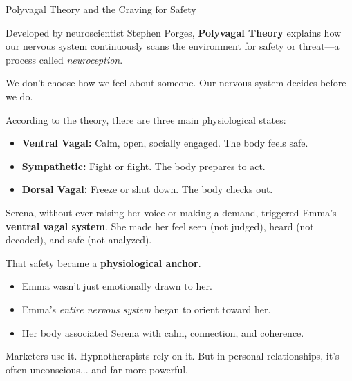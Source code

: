 \begin{PsychologicalSidebar}{Polyvagal Theory and the Craving for Safety}

    Developed by neuroscientist Stephen Porges, \textbf{Polyvagal Theory} explains how our 
    nervous system continuously scans the environment for safety or threat—a process called 
    \textit{neuroception}.
    
    \medskip
    
    We don’t choose how we feel about someone.  
    Our nervous system decides before we do.
    
    \medskip
    
    According to the theory, there are three main physiological states:

    \medskip
    
    \begin{itemize}
      \item \textbf{Ventral Vagal:} Calm, open, socially engaged. The body feels safe.
      \item \textbf{Sympathetic:} Fight or flight. The body prepares to act.
      \item \textbf{Dorsal Vagal:} Freeze or shut down. The body checks out.
    \end{itemize}
    
    \medskip
    
    Serena, without ever raising her voice or making a demand, triggered Emma’s 
    \textbf{ventral vagal system}.  
    She made her feel seen (not judged), heard (not decoded), and safe (not analyzed).
    
    \medskip
    
    That safety became a \textbf{physiological anchor}.

    \medskip
    
    \begin{itemize}
      \item Emma wasn’t just emotionally drawn to her.
      \item Emma’s \textit{entire nervous system} began to orient toward her.
      \item Her body associated Serena with calm, connection, and coherence.
    \end{itemize}
    
    \medskip

    Marketers use it.  
    Hypnotherapists rely on it.  
    But in personal relationships, it's often unconscious... and far more powerful.


\end{PsychologicalSidebar}
